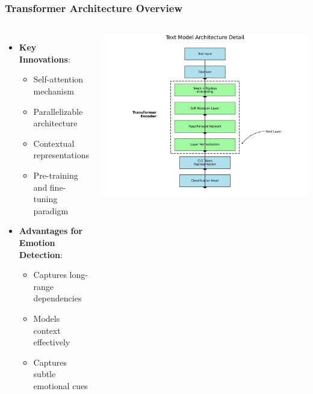 \documentclass{beamer}
\begin{document}
\begin{frame}
\frametitle{Transformer Architecture Overview}
\begin{columns}
\begin{itemize}
    \item \textbf{Key Innovations}:
    \begin{itemize}
        \item Self-attention mechanism
        \item Parallelizable architecture
        \item Contextual representations
        \item Pre-training and fine-tuning paradigm
    \end{itemize}
    \item \textbf{Advantages for Emotion Detection}:
    \begin{itemize}
        \item Captures long-range dependencies
        \item Models context effectively
        \item Captures subtle emotional cues
    \end{itemize}
\end{itemize}

\includegraphics[width=\textwidth]{figures/text_model_architecture.png}
\end{columns}
\end{frame}
\end{document}
